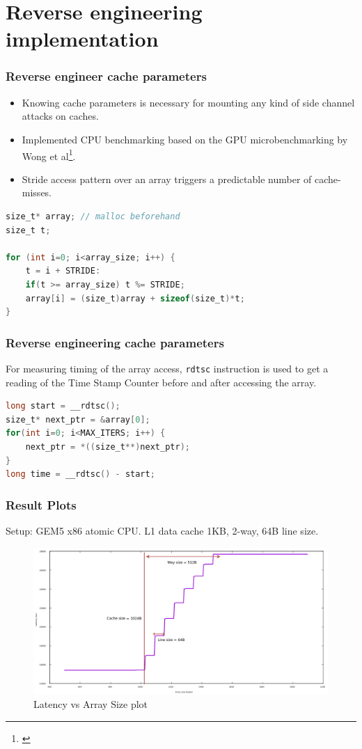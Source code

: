 \documentclass[10pt,usenames,dvipsnames]{beamer}
\begin{document}
\section{Reverse engineering implementation}
\begin{frame}[fragile]
\frametitle{Reverse engineer cache parameters}
\begin{itemize}
    \item Knowing cache parameters is necessary for mounting any kind of side channel
        attacks on caches.
    \item Implemented CPU benchmarking based on the GPU microbenchmarking by
        Wong et al\footnote{\cite{wong}}.
    \item Stride access pattern over an array triggers a predictable number
        of cache-misses.
\end{itemize}

\begin{lstlisting}[caption={Generate array of given size with fixed stride pattern},language={C}]
size_t* array; // malloc beforehand
size_t t;

for (int i=0; i<array_size; i++) {
    t = i + STRIDE:
    if(t >= array_size) t %= STRIDE;
    array[i] = (size_t)array + sizeof(size_t)*t;
}
\end{lstlisting}

\end{frame}


\begin{frame}[fragile]
\frametitle{Reverse engineering cache parameters}
For measuring timing of the array access, \texttt{rdtsc} instruction is used to get a reading of the Time Stamp Counter before
and after accessing the array.

\begin{lstlisting}[caption={Timing measurement of stride access over the entire array},language={C}]
long start = __rdtsc();
size_t* next_ptr = &array[0];
for(int i=0; i<MAX_ITERS; i++) {
    next_ptr = *((size_t**)next_ptr);
}
long time = __rdtsc() - start;
\end{lstlisting}
\end{frame}

\begin{frame}
\frametitle{Result Plots}
Setup: GEM5 x86 atomic CPU. L1 data cache 1KB, 2-way, 64B line size.
\begin{figure}
\includegraphics[width=\textwidth]{reverse_eng_1kb}
\caption{Latency vs Array Size plot}
\end{figure}
\end{frame}
\end{document}
